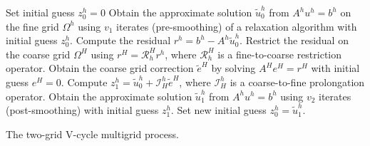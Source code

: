 \begin{algorithm}[t]
	\begin{algorithmic}[1]
		\STATE Set initial guess $z^{h}_0=0$
		\STATE Obtain the approximate solution $\tilde{u}^{h}_0$ from $A^h u^h = b^h$ on the fine grid $\Omega^h$ using $v_1$ iterates (pre-smoothing) of a relaxation algorithm with initial guess $z^{h}_0$.\label{alg:fg}
		\STATE Compute the residual $r^h = b^h - A^h \tilde{u}^{h}_0$.
		\STATE Restrict the residual on the coarse grid $\Omega^H$ using $r^H = \mathcal{R}_{h}^{H} r^h$, where $\mathcal{R}_{h}^{H}$ is a fine-to-coarse restriction operator.
		\STATE Obtain the coarse grid correction $\tilde{e}^H$ by solving $A^H e^H = r^H$ with initial guess $e^H = 0$.\label{alg:crr}
		\STATE Compute $z^{h}_1 = \tilde{u}^{h}_0 + \mathcal{I}_{H}^h \tilde{e}^H$, where $\mathcal{I}_{H}^h$ is a coarse-to-fine prolongation operator.
		\STATE Obtain the approximate solution $\tilde{u}^{h}_1$ from $A^h u^h = b^h$ using $v_2$ iterates (post-smoothing) with initial guess $z^{h}_1$.
		\STATE Set new initial guess $z^{h}_0 = \tilde{u}^{h}_1$.
	\end{algorithmic}
	\caption{The two-grid V-cycle multigrid process.}
	\label{alg:2VMG}
\end{algorithm}

